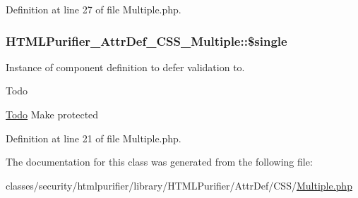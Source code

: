 Definition at line 27 of file Multiple.\+php.

\hypertarget{classHTMLPurifier__AttrDef__CSS__Multiple_a52fb60d24dfe202beeaa7f7c6bad97f1}{
\subsubsection[{\$single}]{\setlength{\rightskip}{0pt plus 5cm}H\+T\+M\+L\+Purifier\+\_\+\+Attr\+Def\+\_\+\+C\+S\+S\+\_\+\+Multiple\+::\$single}}\label{classHTMLPurifier__AttrDef__CSS__Multiple_a52fb60d24dfe202beeaa7f7c6bad97f1}
Instance of component definition to defer validation to. \begin{DoxyRefDesc}{Todo}
\item[\hyperlink{todo__todo000005}{Todo}]Make protected \end{DoxyRefDesc}


Definition at line 21 of file Multiple.\+php.



The documentation for this class was generated from the following file\+:\begin{DoxyCompactItemize}
\item 
classes/security/htmlpurifier/library/\+H\+T\+M\+L\+Purifier/\+Attr\+Def/\+C\+S\+S/\hyperlink{Multiple_8php}{Multiple.\+php}\end{DoxyCompactItemize}
